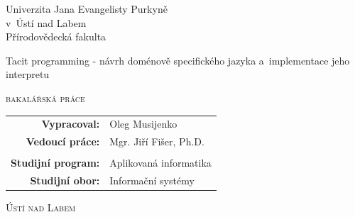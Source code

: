 \documentclass[male, czech]{kithesis}
\newcommand{\AUTOR}{Oleg Musijenko}
\newcommand{\TITULcz}{Tacit programming - návrh doménově specifického jazyka a~implementace jeho interpretu} %
\newcommand{\VEDOUCI}{Mgr. Jiří Fišer, Ph.D.}
\newcommand{\PROGRAM}{Aplikovaná informatika}
\newcommand{\OBOR}{Informační systémy}
\begin{document}
\thispagestyle{empty}
\begin{center}
{\Huge Univerzita Jana Evangelisty Purkyně \\
v~Ústí nad Labem}
\\[16pt]
{\huge Přírodovědecká fakulta}

\vspace{2cm}

\vspace{2cm}
{
\huge
\TITULcz\par

\vspace{0.5em}
\LARGE\scshape bakalářská práce
}
\end{center} 
 
\vfill
{
\large
\begin{tabular}{>{\bfseries}rl}
    Vypracoval: 	& \AUTOR\\
    Vedoucí práce: 	& \VEDOUCI\\
&\\
Studijní program:       & \PROGRAM\\
Studijní obor:          & \OBOR\\
\end{tabular} 
}
\vspace{1.5cm}
\begin{center}
\Large\scshape   Ústí nad Labem \the\year
\end{center}

\cleardoublepage
\thispagestyle{empty}




\end{document}
